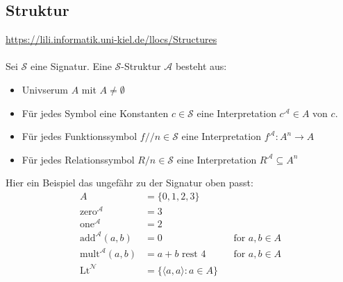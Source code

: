 \documentclass[twocolumn]{article}
\begin{document}
    \subsection{Struktur}
    \url{https://lili.informatik.uni-kiel.de/llocs/Structures}\\\\
    Sei $\mathcal S$ eine Signatur. Eine $\mathcal S$-Struktur $\mathcal A$ besteht aus:
    \begin{itemize}
        \item Univserum $A$ mit $A \not= \emptyset$
        \item Für jedes Symbol eine Konstanten $c \in \mathcal{S}$ eine Interpretation $c^\mathcal A \in A$ von $c$.
        \item Für jedes Funktionssymbol $f/\!/n \in \mathcal S$ eine Interpretation $f^\mathcal A \colon A^n \to A$
        \item Für jedes Relationssymbol $R/n \in \mathcal S$ eine Interpretation $R^\mathcal A \subseteq A^n$
    \end{itemize}
    Hier ein Beispiel das ungefähr zu der Signatur oben passt:\\
    \begin{align*}
        A & = \{0, 1, 2, 3\} \\
        \text{zero}^\mathcal A & = 3\\
        \text{one}^\mathcal A & = 2\\
        \text{add}^\mathcal A(a,b) & = 0 && \text{for $a, b \in A$}\\
        \text{mult}^\mathcal A(a,b) & = a + b \text{ rest } 4 && \text{for $a, b \in A$}\\
        \text{Lt}^\mathcal N & = \{\langle a, a\rangle \colon a \in A\}
    \end{align*}
\end{document}
